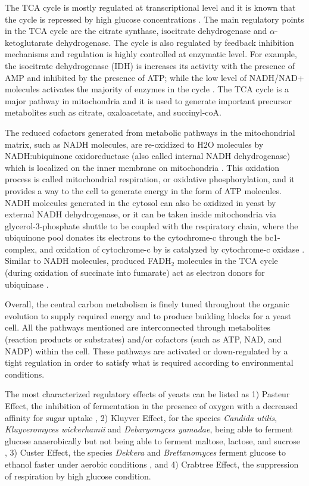 The TCA cycle is mostly regulated at transcriptional level and it is known that the cycle is repressed by high glucose concentrations \cite{liu1999transcriptional}. The main regulatory points in the TCA cycle are the citrate synthase, isocitrate dehydrogenase and $\alpha$-ketoglutarate dehydrogenase. The cycle is also regulated by feedback inhibition mechanisms and regulation is highly controlled at enzymatic level. For example, the isocitrate dehydrogenase (IDH) is increases its activity with the presence of AMP and inhibited by the presence of ATP\cite{coleman1975regulation}; while the low level of NADH/NAD+ molecules activates the majority of enzymes in the cycle \cite{gadde1997mutations}. The TCA cycle is a major pathway in mitochondria and it is used to generate important precursor metabolites such as citrate, oxaloacetate, and succinyl-coA.

The reduced cofactors generated from metabolic pathways in the mitochondrial matrix, such as NADH molecules, are re-oxidized to H2O molecules by NADH:ubiquinone oxidoreductase (also called internal NADH dehydrogenase) which is localized on the inner membrane on mitochondria \cite{bakker2001stoichiometry}. This oxidation process is called mitochondrial respiration, or oxidative phosphorylation, and it provides a way to the cell to generate energy in the form of ATP molecules. NADH molecules generated in the cytosol can also be oxidized in yeast by external NADH dehydrogenase, or it can be taken inside mitochondria via glycerol-3-phosphate shuttle to be coupled with the respiratory chain, where the ubiquinone pool donates \cite{zitomer1979transcriptional} its electrons to the cytochrome-c through the bc1-complex, and oxidation of cytochrome-c by is catalyzed by cytochrome-c oxidase \cite{de1987mitochondrial}. Similar to NADH molecules, produced FADH$_2$ molecules in the TCA cycle (during oxidation of succinate into fumarate) act as electron donors for ubiquinase \cite{cimini2009global}.

Overall, the central carbon metabolism is finely tuned throughout the organic evolution to supply required energy and to produce building blocks for a yeast cell. All the pathways mentioned are interconnected through metabolites (reaction products or substrates) and/or cofactors (such as ATP, NAD, and NADP) within the cell. These pathways are activated or down-regulated by a tight regulation in order to satisfy what is required according to environmental conditions.

The most characterized regulatory effects of yeasts can be listed as 1) Pasteur Effect, the inhibition of fermentation in the presence of oxygen with a decreased affinity for sugar uptake \cite{lagunas1983role}, 2) Kluyver Effect, for the species \emph{Candida utilis}, \emph{Kluyveromyces wickerhamii} and \emph{Debaryomyces yamadae}, being able to ferment glucose anaerobically but not being able to ferment maltose, lactose, and sucrose \cite{kaliterna1995transient}, 3) Custer Effect, the species \emph{Dekkera} and \emph{Brettanomyces} ferment glucose to ethanol faster under aerobic conditions \cite{scheffers1966stimulation}, and 4) Crabtree Effect, the suppression of respiration by high glucose condition.

